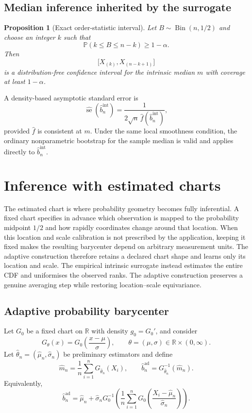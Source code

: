 \documentclass[11pt,a4paper]{article}
\newtheorem{proposition}[theorem]{Proposition}
\theoremstyle{definition}
\newcommand{\Prob}{\mathbb{P}}
\newcommand{\R}{\mathbb{R}}
\begin{document}
\subsection{Median inference inherited by the surrogate}

\begin{proposition}[Exact order-statistic interval]\label{prop:median-exact-ci}
Let $B\sim\operatorname{Bin}(n,1/2)$ and choose an integer $k$ such that
\[
\Prob(k\leq B\leq n-k)\geq1-\alpha.
\]
Then
\[
\bigl[X_{(k)},X_{(n-k+1)}\bigr]
\]
is a distribution-free confidence interval for the intrinsic median $m$ with coverage at least $1-\alpha$.
\end{proposition}

A density-based asymptotic standard error is
\[
\widehat{\operatorname{se}}(\widehat b_n^{\mathrm{int}})
=
\frac1{2\sqrt n\,\widehat f(\widehat b_n^{\mathrm{int}})},
\]
provided $\widehat f$ is consistent at $m$. Under the same local smoothness condition, the ordinary nonparametric bootstrap for the sample median is valid and applies directly to $\widehat b_n^{\mathrm{int}}$.

\section{Inference with estimated charts}\label{sec:estimated}

The estimated chart is where probability geometry becomes fully inferential. A fixed chart specifies in advance which observation is mapped to the probability midpoint $1/2$ and how rapidly coordinates change around that location. When this location and scale calibration is not prescribed by the application, keeping it fixed makes the resulting barycenter depend on arbitrary measurement units. The adaptive construction therefore retains a declared chart shape and learns only its location and scale. The empirical intrinsic surrogate instead estimates the entire CDF and uniformises the observed ranks. The adaptive construction preserves a genuine averaging step while restoring location--scale equivariance.

\subsection{Adaptive probability barycenter}

Let $G_0$ be a fixed chart on $\R$ with density $g_0=G_0'$, and consider
\[
G_\theta(x)
=
G_0\!\left(\frac{x-\mu}{\sigma}\right),
\qquad
\theta=(\mu,\sigma)\in\R\times(0,\infty).
\]
Let $\widehat\theta_n=(\widehat\mu_n,\widehat\sigma_n)$ be preliminary estimators and define
\[
\widehat m_n
=
\frac1n\sum_{i=1}^nG_{\widehat\theta_n}(X_i),
\qquad
\widehat b_n^{\mathrm{ad}}
=
G_{\widehat\theta_n}^{-1}(\widehat m_n).
\]
Equivalently,
\[
\widehat b_n^{\mathrm{ad}}
=
\widehat\mu_n
+
\widehat\sigma_nG_0^{-1}\!\left(
\frac1n\sum_{i=1}^n
G_0\!\left(\frac{X_i-\widehat\mu_n}{\widehat\sigma_n}\right)
\right).
\]
\end{document}
